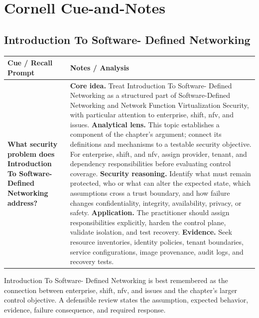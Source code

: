 \documentclass[11pt]{article}
\newcommand{\CornellHeader}{%
\rowcolor{Navy}\color{white}\bfseries Cue / Recall Prompt & \color{white}\bfseries Notes / Analysis\\\hline}
\newcommand{\CornellRow}[2]{%
\cellcolor{CueGray}\RaggedRight\textbf{#1} & \RaggedRight #2\\\hline}
\begin{document}
\section*{Cornell Cue-and-Notes}
\subsection*{Introduction To Software- Defined Networking}
\begin{longtable}{>{\RaggedRight\arraybackslash}p{}|>{\RaggedRight\arraybackslash}p{}}
\CornellHeader
\CornellRow{What security problem does Introduction To Software- Defined Networking address?}{\textbf{Core idea.} Treat Introduction To Software- Defined Networking as a structured part of Software-Defined Networking and Network Function Virtualization Security, with particular attention to enterprise, shift, nfv, and issues. \textbf{Analytical lens.} This topic establishes a component of the chapter's argument; connect its definitions and mechanisms to a testable security objective. For enterprise, shift, and nfv, assign provider, tenant, and dependency responsibilities before evaluating control coverage. \textbf{Security reasoning.} Identify what must remain protected, who or what can alter the expected state, which assumptions cross a trust boundary, and how failure changes confidentiality, integrity, availability, privacy, or safety. \textbf{Application.} The practitioner should assign responsibilities explicitly, harden the control plane, validate isolation, and test recovery. \textbf{Evidence.} Seek resource inventories, identity policies, tenant boundaries, service configurations, image provenance, audit logs, and recovery tests.}
\end{longtable}
\begin{topicsummary}
Introduction To Software- Defined Networking is best remembered as the connection between enterprise, shift, nfv, and issues and the chapter's larger control objective. A defensible review states the assumption, expected behavior, evidence, failure consequence, and required response.
\end{topicsummary}
\end{document}
